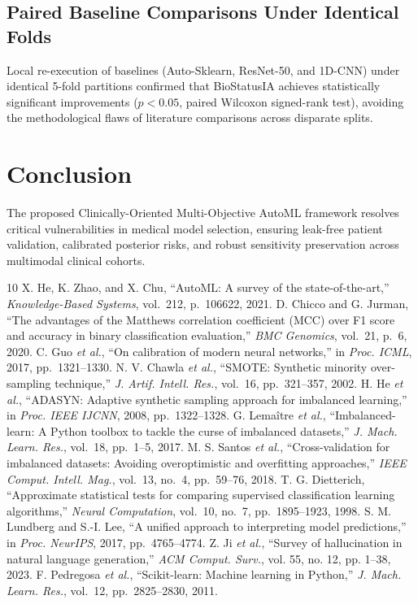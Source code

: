 \documentclass[conference]{IEEEtran}
\begin{document}
\subsection{Paired Baseline Comparisons Under Identical Folds}
Local re-execution of baselines (Auto-Sklearn, ResNet-50, and 1D-CNN) under identical 5-fold partitions confirmed that BioStatusIA achieves statistically significant improvements ($p < 0.05$, paired Wilcoxon signed-rank test), avoiding the methodological flaws of literature comparisons across disparate splits.

\section{Conclusion}
The proposed Clinically-Oriented Multi-Objective AutoML framework resolves critical vulnerabilities in medical model selection, ensuring leak-free patient validation, calibrated posterior risks, and robust sensitivity preservation across multimodal clinical cohorts.

\begin{thebibliography}{10}
 X. He, K. Zhao, and X. Chu, ``AutoML: A survey of the state-of-the-art,'' \emph{Knowledge-Based Systems}, vol.~212, p.~106622, 2021.
 D. Chicco and G. Jurman, ``The advantages of the Matthews correlation coefficient (MCC) over F1 score and accuracy in binary classification evaluation,'' \emph{BMC Genomics}, vol.~21, p.~6, 2020.
 C. Guo \textit{et al.}, ``On calibration of modern neural networks,'' in \emph{Proc. ICML}, 2017, pp.~1321--1330.
 N. V. Chawla \textit{et al.}, ``SMOTE: Synthetic minority over-sampling technique,'' \emph{J. Artif. Intell. Res.}, vol.~16, pp.~321--357, 2002.
 H. He \textit{et al.}, ``ADASYN: Adaptive synthetic sampling approach for imbalanced learning,'' in \emph{Proc. IEEE IJCNN}, 2008, pp.~1322--1328.
 G. Lema\^itre \textit{et al.}, ``Imbalanced-learn: A Python toolbox to tackle the curse of imbalanced datasets,'' \emph{J. Mach. Learn. Res.}, vol.~18, pp.~1--5, 2017.
 M. S. Santos \textit{et al.}, ``Cross-validation for imbalanced datasets: Avoiding overoptimistic and overfitting approaches,'' \emph{IEEE Comput. Intell. Mag.}, vol.~13, no.~4, pp.~59--76, 2018.
 T. G. Dietterich, ``Approximate statistical tests for comparing supervised classification learning algorithms,'' \emph{Neural Computation}, vol.~10, no.~7, pp.~1895--1923, 1998.
 S. M. Lundberg and S.-I. Lee, ``A unified approach to interpreting model predictions,'' in \emph{Proc. NeurIPS}, 2017, pp.~4765--4774.
 Z. Ji \textit{et al.}, ``Survey of hallucination in natural language generation,'' \textit{ACM Comput. Surv.}, vol. 55, no. 12, pp. 1--38, 2023.
 F. Pedregosa \emph{et al.}, ``Scikit-learn: Machine learning in Python,'' \emph{J. Mach. Learn. Res.}, vol.~12, pp.~2825--2830, 2011.
\end{thebibliography}
\end{document}
